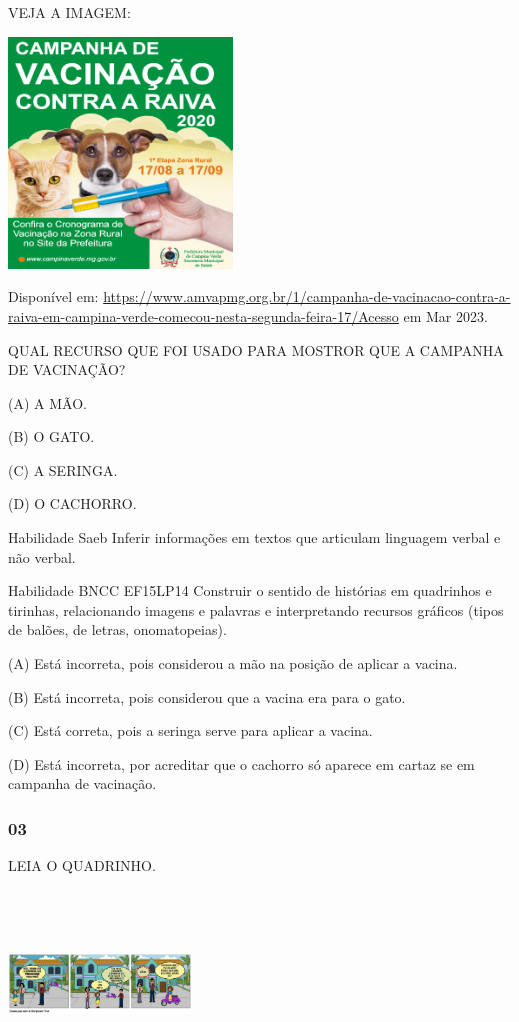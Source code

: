 VEJA A IMAGEM:

\includegraphics[width=2.34507in,height=2.41801in]{media/image137.png}

Disponível em:
\url{https://www.amvapmg.org.br/1/campanha-de-vacinacao-contra-a-raiva-em-campina-verde-comecou-nesta-segunda-feira-17/Acesso}
em Mar 2023.

QUAL RECURSO QUE FOI USADO PARA MOSTROR QUE A CAMPANHA DE VACINAÇÃO?

(A) A MÃO.

(B) O GATO.

(C) A SERINGA.

(D) O CACHORRO.

Habilidade Saeb Inferir informações em textos que articulam linguagem
verbal e não verbal.

Habilidade BNCC EF15LP14 Construir o sentido de histórias em quadrinhos
e tirinhas, relacionando imagens e palavras e interpretando recursos
gráficos (tipos de balões, de letras, onomatopeias).

(A) Está incorreta, pois considerou a mão na posição de aplicar a
vacina.

(B) Está incorreta, pois considerou que a vacina era para o gato.

(C) Está correta, pois a seringa serve para aplicar a vacina.

(D) Está incorreta, por acreditar que o cachorro só aparece em cartaz se
em campanha de vacinação.

\subsubsection{03}\label{section-93}

LEIA O QUADRINHO.

\includegraphics[width=1.92014in,height=1.95486in]{media/image138.png}

